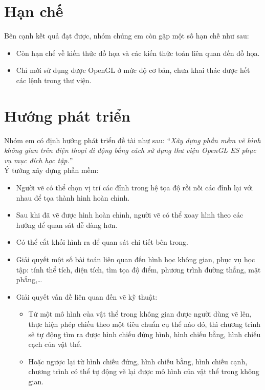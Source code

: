 \documentclass[13pt,a4paper]{extreport}
\begin{document}
\section{Hạn chế}
	Bên cạnh kết quả đạt được, nhóm chúng em còn gặp một số hạn chế như sau:
		\begin{itemize}
			\item Còn hạn chế về kiến thức đồ họa và các kiến thức toán liên quan đến đồ họa.
			
			\item Chỉ mới sử dụng được OpenGL ở mức độ cơ bản, chưa khai thác được hết các lệnh trong thư viện.		
		\end{itemize}

\section{Hướng phát triển}
	Nhóm em có định hướng phát triển đề tài như sau: ``\emph{Xây dựng phần mềm vẽ hình không gian trên điện thoại di động bằng cách sử dụng thư viện OpenGL ES phục vụ mục đích học tập.}''\\

	Ý tưởng xây dựng phần mềm:
	\begin{itemize}
		\item Người vẽ có thể chọn vị trí các đỉnh trong hệ tọa độ rồi nối các đỉnh lại với nhau để tọa thành hình hoàn chỉnh.
		
		\item Sau khi đã vẽ được hình hoàn chỉnh, người vẽ có thể xoay hình theo các hướng để quan sát dễ dàng hơn.	
		
		\item Có thể cắt khối hình ra để quan sát chi tiết bên trong.
		
		\item Giải quyết một số bài toán liên quan đến hình học không gian, phục vụ học tập: tính thể tích, diện tích, tìm tọa độ điểm, phương trình đường thẳng, mặt phẳng,\ldots
		
		\item Giải quyết vấn đề liên quan đến vẽ kỹ thuật:
			\begin{itemize}
				\item Từ một mô hình của vật thể trong không gian được người dùng vẽ lên, thực hiện phép chiếu theo một tiêu chuẩn cụ thể nào đó, thì chương trình sẽ tự động tìm ra được hình chiếu đứng hình, hình chiếu bằng, hình chiếu cạch của vật thể. 

				\item Hoặc ngược lại từ hình chiếu đứng, hình chiếu bằng, hình chiếu cạnh, chương trình có thể tự động vẽ lại được mô hình của vật thể trong không gian.
			\end{itemize}				
	\end{itemize}
\end{document}
